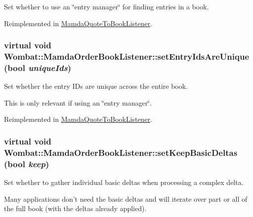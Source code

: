 Set whether to use an \char`\"{}entry manager\char`\"{} for finding entries in a book. 



Reimplemented in \hyperlink{classMamdaQuoteToBookListener_4daf6a6cca90d21bc7902ab6a7ea5008}{Mamda\-Quote\-To\-Book\-Listener}.\hypertarget{classWombat_1_1MamdaOrderBookListener_4c08ce3aefa0cddb9980a7a8cf043545}{
\subsubsection[setEntryIdsAreUnique]{\setlength{\rightskip}{0pt plus 5cm}virtual void Wombat::Mamda\-Order\-Book\-Listener::set\-Entry\-Ids\-Are\-Unique (bool {\em unique\-Ids})}}
\label{classWombat_1_1MamdaOrderBookListener_4c08ce3aefa0cddb9980a7a8cf043545}


Set whether the entry IDs are unique across the entire book. 

This is only relevant if using an \char`\"{}entry manager\char`\"{}. 

Reimplemented in \hyperlink{classMamdaQuoteToBookListener_478d71d5ccdbc4d692d7b69df2ed5c91}{Mamda\-Quote\-To\-Book\-Listener}.\hypertarget{classWombat_1_1MamdaOrderBookListener_393f4acf6e9f87dc8c1de480398d2c6e}{
\subsubsection[setKeepBasicDeltas]{\setlength{\rightskip}{0pt plus 5cm}virtual void Wombat::Mamda\-Order\-Book\-Listener::set\-Keep\-Basic\-Deltas (bool {\em keep})}}
\label{classWombat_1_1MamdaOrderBookListener_393f4acf6e9f87dc8c1de480398d2c6e}


Set whether to gather individual basic deltas when processing a complex delta. 

Many applications don't need the basic deltas and will iterate over part or all of the full book (with the deltas already applied). 

